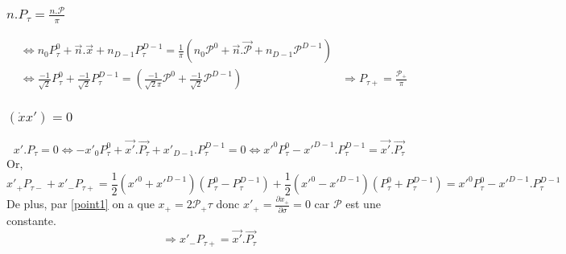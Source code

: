 \documentclass[a4paper,12pt]{article}
\begin{document}
\subsubsection{$n.P_\tau=\frac{n.\mathcal{P}}{\pi}$}
\begin{align*}
&\Leftrightarrow n_0P_\tau^0 + \vec{n}.\vec{x} + n_{D-1}P_\tau^{D-1}=\frac{1}{\pi}\left( n_0\mathcal{P}^0 + \vec{n}.\vec{\mathcal{P}} + n_{D-1}\mathcal{P}^{D-1}\right)\\
&\Leftrightarrow \frac{-1}{\sqrt{2}}P_\tau^0 + \frac{-1}{\sqrt{2}}P_\tau^{D-1}=\left( \frac{-1}{\sqrt{2}\pi}\mathcal{P}^0  + \frac{-1}{\sqrt{2}}\mathcal{P}^{D-1}\right)
&\Rightarrow\boxed{P_{\tau+} = \frac{\mathcal{P_+}}{\pi}}
\end{align*}
\subsubsection{$(\dot{x}x')=0$}
\begin{equation*}
 x'.P_\tau=0
\Leftrightarrow -x'_0P_\tau^0 +\vec{x'}.\vec{P_\tau} + x'_{D-1}.P_\tau^{D-1} =0
\Leftrightarrow x'^0P_\tau^0 - x'^{D-1}.P_\tau^{D-1}=\vec{x'}.\vec{P_\tau}
\end{equation*}
Or,
\begin{equation*}
x'_+P_{\tau -} + x'_-P_{\tau +}=\frac{1}{2}\left( x'^0 + x'^{D-1}\right) \left(P_\tau^0 - P_\tau^{D-1}\right) + \frac{1}{2}\left( x'^0 - x'^{D-1}\right) \left(P_\tau^0 + P_\tau^{D-1}\right)=x'^0P_\tau^0 - x'^{D-1}.P_\tau^{D-1}
\end{equation*}
De plus, par \eqref{point1} on a que $x_+ = 2 \mathcal{P_+}\tau$ donc $x'_+=\frac{\partial x_+}{\partial \sigma}=0$ car $\mathcal{P}$ est une constante.
$$\Rightarrow\boxed{x'_-P_{\tau +}=\vec{x'}.\vec{P_\tau}}$$
\end{document}
